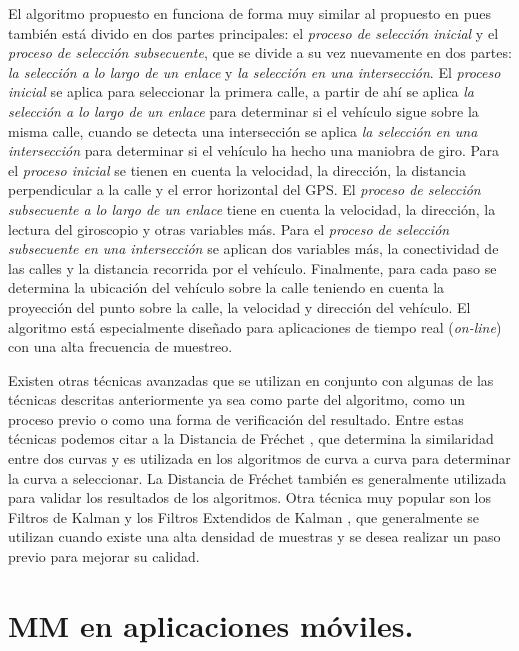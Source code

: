 El algoritmo propuesto en \cite{quddus2006high} funciona de forma muy similar al propuesto en \cite{ochieng2009map} pues también está divido en dos partes principales: el \emph{proceso de selección inicial} y el \emph{proceso de selección subsecuente}, que se divide a su vez nuevamente en dos partes: \emph{la selección a lo largo de un enlace} y  \emph{la selección en una intersección}. El \emph{proceso inicial} se aplica para seleccionar la primera calle, a partir de ahí se aplica \emph{la selección a lo largo de un enlace} para determinar si el vehículo sigue sobre la misma calle, cuando se detecta una intersección se aplica \emph{la selección en una intersección} para determinar si el vehículo ha hecho una maniobra de giro. Para el \emph{proceso inicial} se tienen en cuenta la velocidad, la dirección, la distancia perpendicular a la calle y el error horizontal del GPS. El \emph{proceso de selección subsecuente a lo largo de un enlace} tiene en cuenta la velocidad, la dirección, la lectura del giroscopio y otras variables más. Para el \emph{proceso de selección subsecuente en una intersección} se aplican dos variables más, la conectividad de las calles y la distancia recorrida por el vehículo. Finalmente, para cada paso se determina la ubicación del vehículo sobre la calle teniendo en cuenta la proyección del punto sobre la calle, la velocidad y dirección del vehículo. El algoritmo está especialmente diseñado para aplicaciones de tiempo real (\emph{on-line}) con una alta frecuencia de muestreo.

Existen otras técnicas avanzadas que se utilizan en conjunto con algunas de las técnicas descritas anteriormente ya sea como parte del algoritmo, como un proceso previo o como una forma de verificación del resultado. Entre estas técnicas podemos citar a la Distancia de Fréchet \cite{chen2011approximate,eisner2011algorithms}, que determina la similaridad entre dos curvas y es utilizada en los algoritmos de curva a curva para determinar la curva a seleccionar. La Distancia de Fréchet también es generalmente utilizada para validar los resultados de los algoritmos. Otra técnica muy popular son los Filtros de Kalman y los Filtros Extendidos de Kalman \cite{kim2001adaptive}, que generalmente se utilizan cuando existe una alta densidad de muestras y se desea realizar un paso previo para mejorar su calidad.

\section{MM en aplicaciones móviles.}


